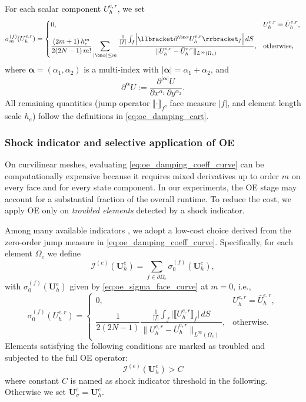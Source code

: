 \documentclass[fleqn,11pt]{amsart}
\begin{document}
For each scalar component $U_h^{e,r}$, we set
\begin{equation}
\label{eq:oe_damping_coeff_curve}
\sigma_m^{(f)}(U_h^{e,r})
=
\begin{cases}
0,
& U_h^{e,r} = \bar U_h^{e,r}, \\[1.2ex]
\dfrac{(2m+1)\,h_e^{m}}{2(2N-1)\,m!}
\displaystyle\sum_{|\bm\alpha|\le m}
\dfrac{
\frac{1}{|f|}
\int_{f}
\Bigl|\llbracket \partial^{\bm\alpha}U_h^{e,r}\rrbracket_f\Bigr|
\, dS
}{
\|U_h^{e,r}-\bar U_h^{e,r}\|_{L^{\infty}(\Omega_e)}
},
& \text{otherwise},
\end{cases}
\end{equation}
where $\bm\alpha=(\alpha_1,\alpha_2)$ is a multi-index with
$|\bm\alpha|=\alpha_1+\alpha_2$, and
\[
\partial^{\bm\alpha}U
:=
\frac{\partial^{|\bm\alpha|}U}{\partial x^{\alpha_1}\,\partial y^{\alpha_2}}.
\]
All remaining quantities (jump operator $\llbracket\cdot\rrbracket_f$,
face measure $|f|$, and element length scale $h_e$) follow the
definitions in \eqref{eq:oe_damping_cart}.

\subsubsection{Shock indicator and selective application of OE}

On curvilinear meshes, evaluating \eqref{eq:oe_damping_coeff_curve} can
be computationally expensive because it requires mixed derivatives up to
order $m$ on every face and for every state component. In our
experiments, the OE stage may account for a substantial fraction of the
overall runtime. To reduce the cost, we apply OE only on
\emph{troubled elements} detected by a shock indicator.

Among many available indicators
\cite{krivodonova2004shock,fu2017new,qiu2005comparison}, we adopt a
low-cost choice derived from the zero-order jump measure in
\eqref{eq:oe_damping_coeff_curve}. Specifically, for each element
$\Omega_e$ we define
\begin{equation}
\label{eq:oe_indicator}
\mathcal I^{(e)}(\bm U_h^e)
=
\sum_{f\in\partial\Omega_e}\sigma_0^{(f)}(\bm U_h^e),
\end{equation}
with $\sigma_0^{(f)}(\bm U_h^e)$ given by \eqref{eq:oe_sigma_face_curve}
at $m=0$, i.e.,
\begin{equation}
\label{eq:oe_indicator_explicit}
\sigma_0^{(f)}(U_h^{e,r})
=
\begin{cases}
0,
& U_h^{e,r} = \bar U_h^{e,r}, \\[1.2ex]
\dfrac{1}{2(2N-1)}
\dfrac{
\frac{1}{|f|}\int_{f}\bigl|\llbracket U_h^{e,r}\rrbracket_f\bigr|\,dS
}{
\|U_h^{e,r}-\bar U_h^{e,r}\|_{L^{\infty}(\Omega_e)}
},
& \text{otherwise}.
\end{cases}
\end{equation}
Elements satisfying the following conditions are marked as troubled and subjected to the full OE operator:
\begin{equation}
\label{eq:oe C}
   \mathcal I^{(e)}(\bm U_h^e)>C 
\end{equation}
where constant $C$ is named as shock indicator threshold in the following. Otherwise we set
$\bm U_\sigma^e=\bm U_h^e$.
\end{document}
